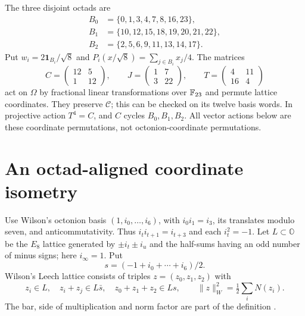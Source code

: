 \documentclass[10pt,reqno]{amsart}
\theoremstyle{remark}\newtheorem{remark}[theorem]{Remark}
\newcommand{\one}{\mathbf1}\newcommand{\Span}{\operatorname{span}}
\begin{document}
The three disjoint octads are
\begin{align*}
B_0&=\{0,1,3,4,7,8,16,23\},\\
B_1&=\{10,12,15,18,19,20,21,22\},\\
B_2&=\{2,5,6,9,11,13,14,17\}.
\end{align*}
Put $w_i=2\one_{B_i}/\sqrt8$ and $P_i(x/\sqrt8)=\sum_{j\in B_i}x_j/4$. The matrices
\[
C=\begin{pmatrix}12&5\\1&12\end{pmatrix},\qquad
J=\begin{pmatrix}1&7\\3&22\end{pmatrix},\qquad
T=\begin{pmatrix}4&11\\16&4\end{pmatrix}
\]
act on $\Omega$ by fractional linear transformations over $\mathbb F_{23}$ and permute lattice coordinates. They preserve $\mathcal C$; this can be checked on its twelve basis words. In projective action $T^4=C$, and $C$ cycles $B_0,B_1,B_2$. All vector actions below are these coordinate permutations, not octonion-coordinate permutations.

\section{An octad-aligned coordinate isometry}
Use Wilson's octonion basis $(1,i_0,\ldots,i_6)$, with $i_0i_1=i_3$, its translates modulo seven, and anticommutativity. Thus $i_ti_{t+1}=i_{t+3}$ and each $i_t^2=-1$. Let $L\subset\mathbb O$ be the $E_8$ lattice generated by $\pm i_t\pm i_u$ and the half-sums having an odd number of minus signs; here $i_\infty=1$. Put
\[
s=(-1+i_0+\cdots+i_6)/2.
\]
Wilson's Leech lattice consists of triples $z=(z_0,z_1,z_2)$ with
\begin{equation}\label{eq:wilson}
z_i\in L,\quad z_i+z_j\in L\bar s,\quad z_0+z_1+z_2\in Ls,
\qquad \|z\|_W^2=\tfrac12\sum_iN(z_i).
\end{equation}
The bar, side of multiplication and norm factor are part of the definition \cite[Sections 2--4]{wilson}.
\end{document}
